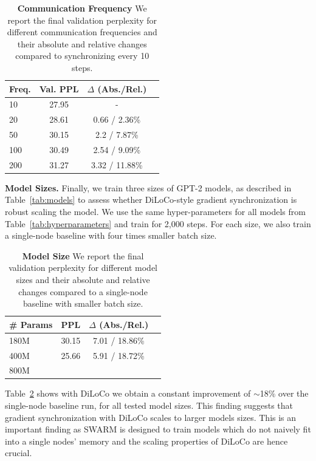 \documentclass{article}
\begin{document}
\begin{table}[ht]
\centering
\begin{tabular}{lccc}
\toprule
\textbf{Freq.} & \textbf{Val. PPL} & \textbf{$\Delta$ (Abs./Rel.)} \\ 
\midrule
10 & 27.95 & - \\
20 & 28.61 & 0.66 / 2.36\% \\
50 & 30.15 & 2.2 / 7.87\% \\
100 & 30.49 & 2.54 / 9.09\% \\
200 & 31.27 & 3.32 / 11.88\% \\
\bottomrule
\end{tabular}
\caption{\textbf{Communication Frequency} We report the final validation
perplexity for different communication frequencies and their absolute and
relative changes compared to synchronizing every 10 steps.}
\label{tab:experiment2}
\end{table}

\textbf{Model Sizes.} Finally, we train three sizes of GPT-2 models, as 
described in Table~\ref{tab:models} to assess whether DiLoCo-style gradient
synchronization is robust scaling the model. We use the same hyper-parameters
for all models from Table~\ref{tab:hyperparameters} and train for 2,000 steps.
For each size, we also train a single-node baseline with four times smaller
batch size.

\begin{table}[ht]
\centering
\begin{tabular}{lccc}
\toprule
\textbf{\# Params} & \textbf{PPL} & \textbf{$\Delta$ (Abs./Rel.)} \\ 
\midrule
180M & 30.15 & 7.01 / 18.86\% \\
400M & 25.66 & 5.91 / 18.72\% \\
800M & & & \\
\bottomrule
\end{tabular}
\caption{\textbf{Model Size} We report the final validation perplexity for
different model sizes and their absolute and relative changes compared to a
single-node baseline with smaller batch size.}
\label{tab:experiment3}
\end{table}

Table~\ref{tab:experiment3} shows with DiLoCo we obtain a constant improvement
of $\sim$18\% over the single-node baseline run, for all tested model sizes.
This finding suggests that gradient synchronization with DiLoCo scales to larger
models sizes. This is an important finding as SWARM is designed to train models
which do not naively fit into a single nodes' memory and the scaling properties
of DiLoCo are hence crucial.
\end{document}
